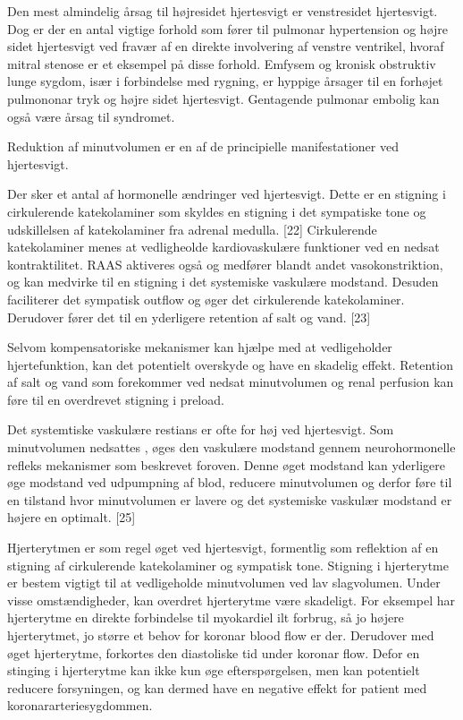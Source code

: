 Den mest almindelig årsag til højresidet hjertesvigt er venstresidet hjertesvigt. Dog er der en antal vigtige forhold som fører til pulmonar hypertension og højre sidet hjertesvigt ved fravær af en direkte involvering af venstre ventrikel, hvoraf mitral stenose er et eksempel på disse forhold. Emfysem og kronisk obstruktiv lunge sygdom, især i forbindelse med rygning, er hyppige årsager til en forhøjet pulmononar tryk og højre sidet hjertesvigt. Gentagende pulmonar embolig kan også være årsag til syndromet. 

Reduktion af minutvolumen er en af de principielle manifestationer ved hjertesvigt. 

Der sker et antal af hormonelle ændringer ved hjertesvigt. Dette er en stigning i cirkulerende katekolaminer som skyldes en stigning i det sympatiske tone og udskillelsen af katekolaminer fra adrenal medulla. [22] Cirkulerende katekolaminer menes at vedligheolde kardiovaskulære funktioner ved en nedsat kontraktilitet. RAAS aktiveres også og medfører blandt andet vasokonstriktion, og kan medvirke til en stigning i det systemiske vaskulære modstand. Desuden faciliterer det sympatisk outflow og øger det cirkulerende katekolaminer. Derudover fører det til en yderligere retention af salt og vand. [23]

Selvom kompensatoriske mekanismer kan hjælpe med at vedligeholder hjertefunktion, kan det potentielt overskyde og have en skadelig effekt. Retention af salt og vand  som forekommer ved nedsat minutvolumen og renal perfusion kan føre til en overdrevet stigning i preload. 

Det systemtiske vaskulære restians er ofte for høj ved hjertesvigt. Som minutvolumen nedsattes , øges den vaskulære modstand gennem neurohormonelle refleks mekanismer som beskrevet foroven. Denne øget modstand kan yderligere øge modstand ved udpumpning af blod, reducere minutvolumen og derfor føre til en tilstand hvor minutvolumen er lavere og det systemiske vaskulær modstand er højere en optimalt. [25]

Hjerterytmen er som regel øget ved hjertesvigt, formentlig som reflektion af en stigning af cirkulerende katekolaminer og sympatisk tone. Stigning i hjerterytme er bestem vigtigt til at vedligeholde minutvolumen ved lav slagvolumen. Under visse omstændigheder, kan overdret  hjerterytme være skadeligt. For eksempel har hjerterytme en direkte forbindelse til myokardiel ilt forbrug, så jo højere hjerterytmet, jo større et behov for koronar blood flow er der. Derudover med øget hjerterytme, forkortes den diastoliske tid under koronar flow. Defor en stinging i hjerterytme kan ikke kun øge efterspørgelsen, men kan potentielt reducere forsyningen, og kan dermed have en negative effekt for patient med koronararteriesygdommen.

